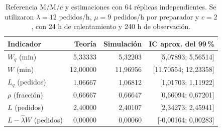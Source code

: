 \begin{table}[htbp]\centering
\caption{Referencia M/M/$c$ y estimaciones con 64 réplicas independientes.
Se utilizaron $\lambda=12$ pedidos/h, $\mu=9$ pedidos/h por preparador
y $c=2$, con 24 h de calentamiento y 240 h de observación.}
\label{tab:verificacion-mmc}
\begin{tabular}{lrrr}\toprule
Indicador & Teoría & Simulación & IC aprox. del 99\,\% \\ \midrule
$W_q$ (min) & 5,33333 & 5,32203 & [5,07893; 5,56514] \\
$W$ (min) & 12,00000 & 11,96956 & [11,70554; 12,23358] \\
$L_q$ (pedidos) & 1,06667 & 1,06812 & [1,01703; 1,11922] \\
$\rho$ (fracción) & 0,66667 & 0,66647 & [0,66094; 0,67201] \\
$L$ (pedidos) & 2,40000 & 2,40107 & [2,34273; 2,45941] \\
$L-\hat\lambda W$ (pedidos) & 0,00000 & 0,00060 & [-0,00164; 0,00283] \\
\bottomrule\end{tabular}
\end{table}
